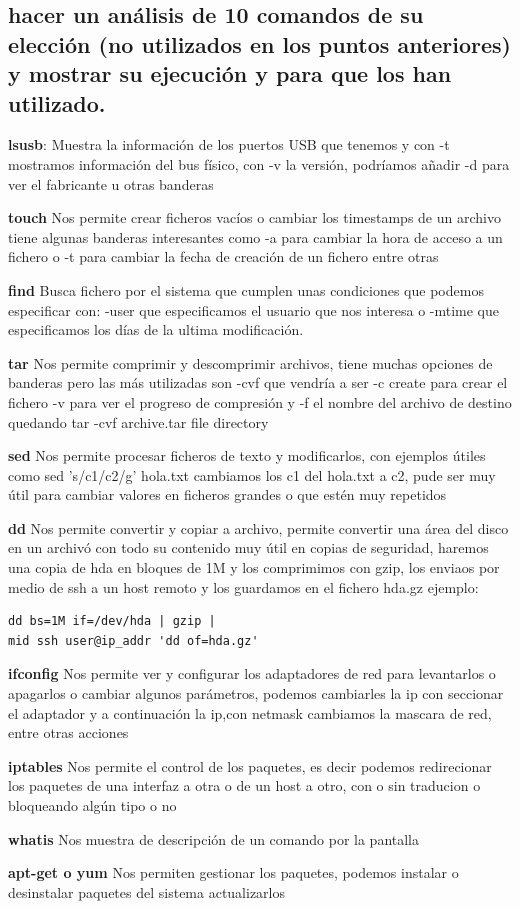 \documentclass[preprint,11pt]{elsarticle}
\begin{document}
\clearpage
\subsection{hacer un análisis de 10 comandos de su elección (no utilizados en los
puntos anteriores) y mostrar su ejecución y para que los han utilizado.}
\begin{multicols}{2}
\textbf{lsusb}: Muestra la información de los puertos USB que tenemos y con -t mostramos información del bus físico, con -v la versión, podríamos añadir -d para ver el fabricante u otras banderas

\textbf{touch} Nos permite crear ficheros vacíos o cambiar los timestamps de un archivo tiene algunas banderas interesantes como -a para cambiar la hora de acceso a un fichero o -t para cambiar la fecha de creación de un fichero entre otras 

\textbf{find}  Busca fichero por el sistema que cumplen unas condiciones que podemos especificar con: -user que especificamos el usuario que nos interesa o -mtime que especificamos los días de la ultima modificación.

\textbf{tar} Nos permite comprimir y descomprimir archivos, tiene muchas opciones de banderas pero las más utilizadas son -cvf que vendría a ser -c create para crear el fichero -v para ver el progreso de compresión y -f el nombre del archivo de destino quedando tar -cvf archive.tar file directory

\textbf{sed} Nos permite procesar ficheros de texto y modificarlos, con ejemplos útiles como sed 's/c1/c2/g' hola.txt cambiamos los c1 del hola.txt a c2, pude ser muy útil para cambiar valores en ficheros grandes o que estén muy repetidos

\textbf{dd} Nos permite convertir y copiar a archivo, permite convertir una área del disco en un archivó con todo su contenido muy útil en copias de seguridad, haremos una copia de hda en bloques de 1M y los comprimimos con gzip, los enviaos por medio de ssh a un host remoto y los guardamos en el fichero hda.gz ejemplo:
\begin{lstlisting}
dd bs=1M if=/dev/hda | gzip |
mid ssh user@ip_addr 'dd of=hda.gz'
\end{lstlisting}

\textbf{ifconfig} Nos permite ver y configurar los adaptadores de red para levantarlos o apagarlos o cambiar algunos parámetros, podemos cambiarles la ip con seccionar el adaptador y a continuación la ip,con netmask cambiamos la mascara de red, entre otras acciones

\textbf{iptables} Nos permite el control de los paquetes, es decir podemos redirecionar los paquetes de una interfaz a otra o de un host a otro, con o sin traducion o bloqueando algún tipo o no

\textbf{whatis} Nos muestra de descripción de un comando por la pantalla

\textbf{apt-get o yum } Nos permiten gestionar los paquetes, podemos instalar o desinstalar paquetes del sistema actualizarlos
\end{multicols}
\end{document}

